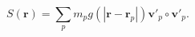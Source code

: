 \begin{equation}
S(\mathbf{r}) = 
\sum_{p}{m_p g(|\mathbf{r} - \mathbf{r}_p|)  
\mathbf{v'}_p \circ \mathbf{v'}_p} .
 \label{eq:sr}
\end{equation}
